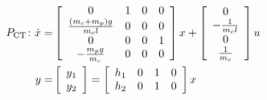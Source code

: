 \begin{subequations}\label{eqn:EoMPendulumCT_ss}
\begin{align}
P_{\rm{CT}}\colon \dot{x}
= & \left[
\begin{array}{cccc}
    0 & 1 & 0 & 0 \\
    \frac{(m_c + m_p) g}{m_c l} & 0 & 0 & 0 \\
    0 & 0 & 0 & 1 \\
    -\frac{m_p g}{m_c}  & 0 & 0 & 0 
\end{array}\right]
x +
\left[
\begin{array}{c}
    0 \\ -\frac{1}{m_c l} \\ 0 \\ \frac{1}{m_c}\\
\end{array}\right] u \\
y = & \left[
\begin{array}{c}
    y_1 \\ y_2 
\end{array}\right]
= \left[
\begin{array}{cccc}
    h_1 & 0 & 1 & 0 \\
    h_2 & 0 & 1 & 0
\end{array}\right]
x
\end{align}
\end{subequations}


